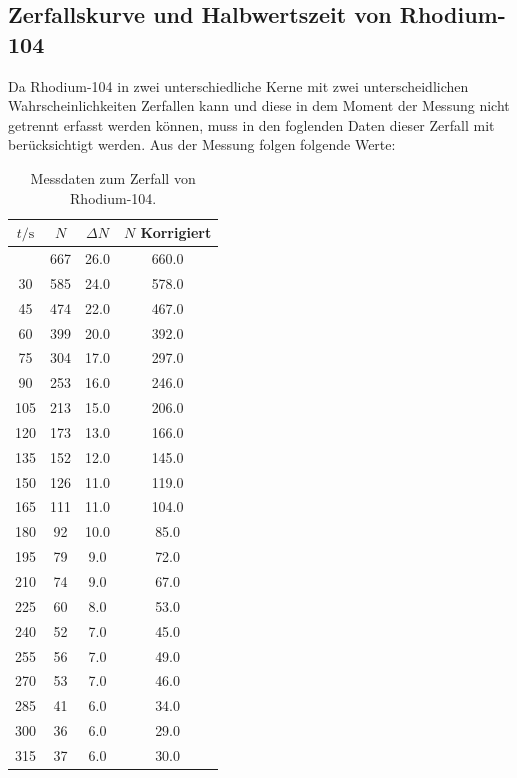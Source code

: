 \subsection{Zerfallskurve und Halbwertszeit von Rhodium-104}
Da Rhodium-104 in zwei unterschiedliche Kerne mit zwei unterscheidlichen Wahrscheinlichkeiten Zerfallen kann und diese in dem Moment der Messung nicht getrennt erfasst werden können,
muss in den foglenden Daten dieser Zerfall mit berücksichtigt werden.
\noindent
Aus der Messung folgen folgende Werte:
\begin{longtable}{c c c c}
	\caption{Messdaten zum Zerfall von Rhodium-104.} \label{tab:rhodium} \\
		\hline
		$t / \si{\second}$ & $N$ & $\Delta N$ &$N$ Korrigiert \\
		\hline
		\endhead
		\hline
		\endfoot
		15  	& 667  	& 26.0         	& 660.0 \\
		 30  	& 585  	& 24.0         	& 578.0 \\
		 45  	& 474  	& 22.0         	& 467.0 \\
		 60  	& 399  	& 20.0         	& 392.0 \\
		 75  	& 304  	& 17.0         	& 297.0 \\
		 90  	& 253  	& 16.0         	& 246.0 \\
		105  	& 213  	& 15.0         	& 206.0 \\
		120  	& 173  	& 13.0         	& 166.0 \\
		135  	& 152  	& 12.0         	& 145.0 \\
		150  	& 126  	& 11.0         	& 119.0 \\
		165  	& 111  	& 11.0         	& 104.0 \\
		180  	&  92  	& 10.0         	&  85.0 \\
		195  	&  79  	&  9.0         	&  72.0 \\
		210  	&  74  	&  9.0         	&  67.0 \\
		225  	&  60  	&  8.0         	&  53.0 \\
		240  	&  52  	&  7.0         	&  45.0 \\
		255  	&  56  	&  7.0         	&  49.0 \\
		270  	&  53  	&  7.0         	&  46.0 \\
		285  	&  41  	&  6.0         	&  34.0 \\
		300  	&  36  	&  6.0         	&  29.0 \\
		315  	&  37  	&  6.0         	&  30.0 \\

\end{longtable}
